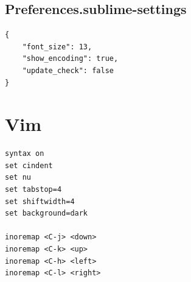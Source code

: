 \documentclass{article}
\begin{document}
\subsection{Preferences.sublime-settings}

\begin{lstlisting}
{
	"font_size": 13, 
	"show_encoding": true,
	"update_check": false
}
\end{lstlisting}

\section{Vim}

\begin{lstlisting}
syntax on
set cindent
set nu
set tabstop=4
set shiftwidth=4
set background=dark

inoremap <C-j> <down>
inoremap <C-k> <up>
inoremap <C-h> <left>
inoremap <C-l> <right>
\end{lstlisting}
\end{document}
